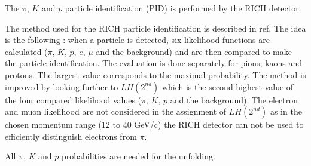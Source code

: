 \documentclass[letterpaper,12pt]{article}
\begin{document}
The $\pi$, $K$ and $p$ particle identification (PID) is performed by the RICH detector.

The method used for the RICH particle identification is described in ref\cite{RICH_NOTE}. The idea is the following : when a particle
is detected, six likelihood functions are calculated ($\pi$, $K$, $p$, $e$, $\mu$ and the background) and are then
compared to make the particle identification. The evaluation is done separately for pions, kaons and protons. The largest
value corresponds to the maximal probability. The method is improved by looking further to $LH(2^{nd})$ which is the second
highest value of the four compared likelihood values ($\pi$, $K$, $p$ and the background). The electron and muon likelihood
are not considered in the assignment of $LH(2^{nd})$ as in the chosen momentum range (12 to 40 GeV/c) the RICH detector can
not be used to efficiently distinguish electrons from $\pi$.

All $\pi$, $K$ and $p$ probabilities are needed for the unfolding.
\end{document}
